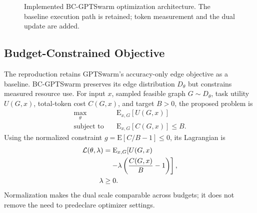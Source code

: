 \begin{figure}[t]
\centering
{}
\caption{Implemented BC-GPTSwarm optimization architecture. The baseline execution path is retained; token measurement and the dual update are added.}
\label{fig:bcgptswarm-architecture}
\end{figure}

\subsection{Budget-Constrained Objective}

The reproduction retains GPTSwarm's accuracy-only edge objective as a baseline. BC-GPTSwarm preserves its edge distribution $D_{\theta}$ but constrains measured resource use. For input $x$, sampled feasible graph $G\sim D_{\theta}$, task utility $U(G,x)$, total-token cost $C(G,x)$, and target $B>0$, the proposed problem is
\begin{align}
    \max_{\theta}\quad & \mathrm{E}_{x,G}[U(G,x)] \\
    \text{subject to}\quad & \mathrm{E}_{x,G}[C(G,x)] \leq B.
\end{align}
Using the normalized constraint $g=\mathrm{E}[C/B-1]\leq0$, its Lagrangian is
\begin{align}
 \mathcal{L}(\theta,\lambda)
 &=\mathrm{E}_{x,G}\!\left[U(G,x)\right. \notag\\
 &\left.\quad-\lambda\left(\frac{C(G,x)}{B}-1\right)\right],\\
 \lambda&\geq0.
\end{align}
Normalization makes the dual scale comparable across budgets; it does not remove the need to predeclare optimizer settings.

